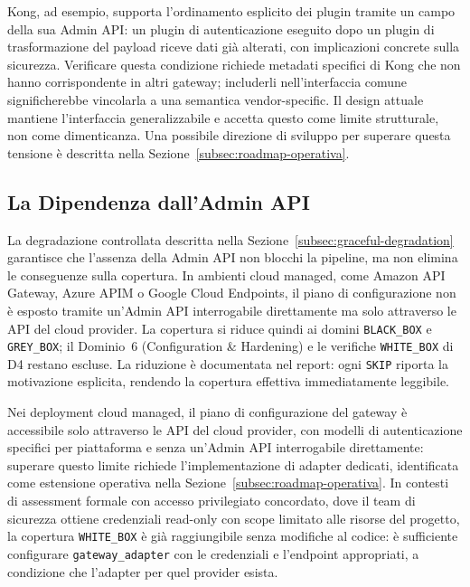 Kong, ad esempio, supporta l'ordinamento esplicito dei plugin tramite un campo della sua Admin \gls{API}: un plugin di autenticazione eseguito dopo un plugin di trasformazione del payload riceve dati già alterati, con implicazioni concrete sulla sicurezza. Verificare questa condizione richiede metadati specifici di Kong che non hanno corrispondente in altri gateway; includerli nell'interfaccia comune significherebbe vincolarla a una semantica vendor-specific. Il design attuale mantiene l'interfaccia generalizzabile e accetta questo come limite strutturale, non come dimenticanza. Una possibile direzione di sviluppo per superare questa tensione è descritta nella Sezione~\ref{subsec:roadmap-operativa}.


\subsection{La Dipendenza dall'Admin API}\label{subsec:limite-admin-api}

La degradazione controllata descritta nella Sezione~\ref{subsec:graceful-degradation} garantisce che l'assenza della Admin \gls{API} non blocchi la pipeline, ma non elimina le conseguenze sulla copertura. In ambienti cloud managed, come Amazon \gls{API} Gateway, Azure \gls{APIM} o Google Cloud Endpoints, il piano di configurazione non è esposto tramite un'Admin \gls{API} interrogabile direttamente ma solo attraverso le \gls{API} del cloud provider.
La copertura si riduce quindi ai domini \texttt{BLACK\_BOX} e \texttt{GREY\_BOX}; il Dominio~6 (Configuration \& Hardening) e le verifiche \texttt{WHITE\_BOX} di D4 restano escluse. La riduzione è documentata nel report: ogni \texttt{SKIP} riporta la motivazione esplicita, rendendo la copertura effettiva immediatamente leggibile.

Nei deployment cloud managed, il piano di configurazione del gateway è accessibile solo attraverso le \gls{API} del cloud provider, con modelli di autenticazione specifici per piattaforma e senza un'Admin \gls{API} interrogabile direttamente: superare questo limite richiede l'implementazione di adapter dedicati, identificata come estensione operativa nella Sezione~\ref{subsec:roadmap-operativa}. In contesti di assessment formale con accesso privilegiato concordato, dove il team di sicurezza ottiene credenziali read-only con scope limitato alle risorse del progetto, la copertura \texttt{WHITE\_BOX} è già raggiungibile senza modifiche al codice: è sufficiente configurare \texttt{gateway\_adapter} con le credenziali e l'endpoint appropriati, a condizione che l'adapter per quel provider esista.



















